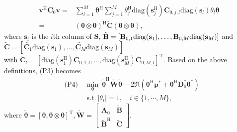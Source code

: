 \documentclass[journal]{IEEEtran}
\begin{document}
{\vspace{-3mm}
\begin{equation} \begin{aligned} 
\mathbf {v}^{\mathrm{H}} \mathbf {C}_{0} \mathbf {v}
=&\sum _{l=1}^{M}\boldsymbol {\theta}^{\mathrm{H}}\sum _{j=1}^{M} {\theta}_{j}^{\mathrm{H}}{\mathrm {diag}}(\mathbf{s}_{j}^{\mathrm{H}}){\mathbf {C}}_{0,j,l}{\mathrm {diag}}(\mathbf{s}_{l}) {\theta}_{l}\boldsymbol {\theta}
\\ =&(\boldsymbol {\theta}\otimes\boldsymbol {\theta})^{\mathrm{H}}\tilde{\mathbf{C}}(\boldsymbol {\theta}\otimes\boldsymbol {\theta}),
\end{aligned}\end{equation}
where $\mathbf{s}_{i}$ is the $i$th column of $\mathbf{S}$,
$\tilde{\mathbf {B}}=[\mathbf {B}_{0,1}{\mathrm {diag}}(\mathbf{s}_{1}), \ldots {},\\\mathbf {B}_{0,M}{\mathrm {diag}}(\mathbf{s}_{M})]$ and $\tilde{\mathbf {C}}=[\tilde{\mathbf {C}_{1}}{\mathrm {diag}}(\mathbf{s}_{1}),\ldots {},\tilde{\mathbf {C}_{M}}{\mathrm {diag}} (\mathbf{s}_{M})]$\\ with
$\tilde{\mathbf {C}_{l}}=[{\mathrm {diag}}(\mathbf{s}_{1}^{\mathrm{H}})\mathbf {C}_{0,1,l},\ldots {},{\mathrm {diag}}(\mathbf{s}_{M}^{\mathrm{H}})\mathbf {C}_{0,M,l}]^{\mathrm{T}}$. Based on the above definitions,
(P3) becomes 
\begin{equation}\begin{aligned}& \text {(P4)}\quad \underset { \boldsymbol {\theta}}{\min }~ \tilde{\boldsymbol {\theta}}^{\mathrm{H}}\tilde{ \mathbf {W}}\tilde{\boldsymbol {\theta}} 
    -2{\Re}(\boldsymbol {\theta }^{\mathrm{H}}\mathbf{p}^{\ast}+\boldsymbol {\theta}^{\mathrm{H}} \mathbf {D}_{0}^{\ast} \boldsymbol {\theta}^{\ast})
    \\&\qquad \quad ~\text {s.t.}~
     |\theta  _{i}|=1, \quad i\in \{1,\cdots,M\} ,
     \end{aligned}\end{equation}
     where  $\tilde{ \boldsymbol {\theta}}\!\!=\!\![\boldsymbol {\theta},\boldsymbol {\theta}\otimes\boldsymbol {\theta}]^{\mathrm{T}},\tilde{ \mathbf {W}}\!\!=\! \!\begin{bmatrix} \mathbf {A}_{0} &\tilde{ \mathbf {B}} \\ \tilde{ \mathbf {B}}^{\mathrm{H}} & \tilde{ \mathbf {C}} \end{bmatrix} $.
}
\end{document}
